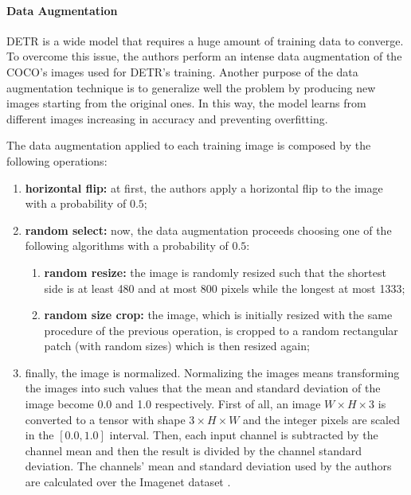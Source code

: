 \paragraph{Data Augmentation} DETR \cite{detr} is a wide model that requires a huge amount of training data to converge. To overcome this issue, the authors perform an intense data augmentation of the COCO's images used for DETR's training. Another purpose of the data augmentation technique is to generalize well the problem by producing new images starting from the original ones. In this way, the model learns from different images increasing in accuracy and preventing overfitting. 

The data augmentation applied to each training image is composed by the following operations:

\begin{enumerate}
	\item \textbf{horizontal flip:} at first, the authors apply a horizontal flip to the image with a probability of $0.5$;
	\item \textbf{random select:} now, the data augmentation proceeds choosing one of the following algorithms with a probability of $0.5$:
	\begin{enumerate}
		\item \textbf{random resize:} the image is randomly resized such that the shortest side is at least 480 and at most 800 pixels while the longest at most 1333;
		\item \textbf{random size crop:} the image, which is initially resized with the same procedure of the previous operation, is cropped to a random rectangular patch (with random sizes) which is then resized again;
	\end{enumerate} 
	\item finally, the image is normalized. Normalizing the images means transforming the images into such values that the mean and standard deviation of the image become 0.0 and 1.0 respectively. First of all, an image $W \times H \times 3$ is converted to a tensor with shape $3 \times H \times W $ and the integer pixels are scaled in the $[0.0, 1.0]$ interval. Then, each input channel is subtracted by the channel mean and then the result is divided by the channel standard deviation. The channels' mean and standard deviation used by the authors are calculated over the Imagenet dataset \cite{imagenet}.
\end{enumerate}

